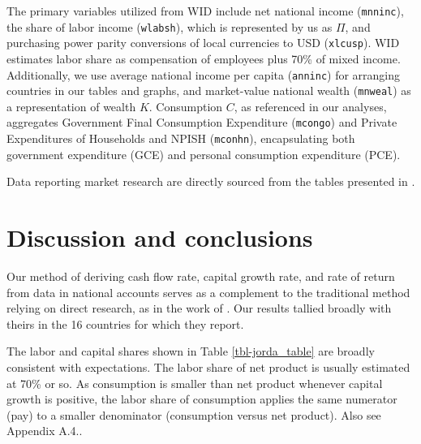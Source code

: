 The primary variables utilized from WID include net national income (\texttt{mnninc}), the share of labor income (\texttt{wlabsh}), which is represented by us as \(\Pi\), and purchasing power parity conversions of local currencies to USD (\texttt{xlcusp}). WID estimates labor share as compensation of employees plus 70\% of mixed income. Additionally, we use average national income per capita (\texttt{anninc}) for arranging countries in our tables and graphs, and market-value national wealth (\texttt{mnweal}) as a representation of wealth $K$. Consumption $C$, as referenced in our analyses, aggregates Government Final Consumption Expenditure (\texttt{mcongo}) and Private Expenditures of Households and NPISH (\texttt{mconhn}), encapsulating both government expenditure (GCE) and personal consumption expenditure (PCE).

Data reporting market research are directly sourced from the tables presented in \cite{jorda2019}.


\section{Discussion and conclusions}

Our method of deriving cash flow rate, capital growth rate, and rate of return from data in national accounts serves as a complement to the traditional method relying on direct research, as in the work of \cite{jorda2019}. Our results tallied broadly with theirs in the 16 countries for which they report.

The labor and capital shares shown in Table \ref{tbl-jorda_table} are broadly consistent with expectations. The labor share of net product is usually estimated at 70\% or so. As consumption is smaller than net product whenever capital growth is positive, the labor share of consumption applies the same numerator (pay) to a smaller denominator (consumption versus net product). Also see Appendix A.4..



\renewcommand{\theequation}{A.\arabic{equation}}
\setcounter{equation}{0}

